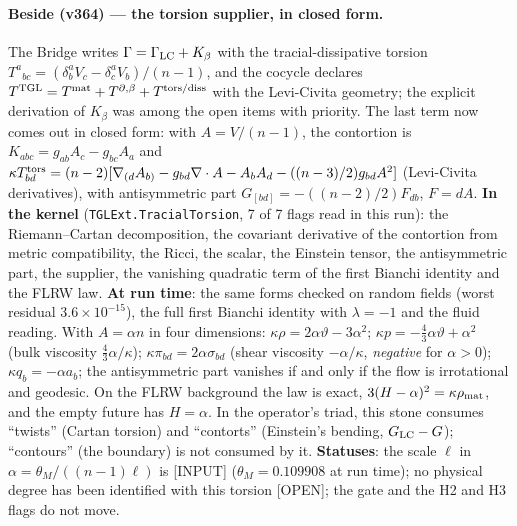 \documentclass[11pt]{article}
\theoremstyle{definition}\newtheorem{deriv}{Derivation}
\begin{document}
\paragraph*{Beside (v364) --- the torsion supplier, in closed form.} The Bridge writes $\Gamma=\Gamma_{\rm LC}+K_\beta$ with the tracial-dissipative torsion $T^a{}_{bc}=(\delta^a_bV_c-\delta^a_cV_b)/(n-1)$, and the cocycle declares $T^{\rm TGL}=T^{\rm mat}+T^{\partial,\beta}+T^{\rm tors/diss}$ with the Levi-Civita geometry; the explicit derivation of $K_\beta$ was among the open items with priority. The last term now comes out in closed form: with $A=V/(n-1)$, the contortion is $K_{abc}=g_{ab}A_c-g_{bc}A_a$ and $\kappa T^{\rm tors}_{bd}=(n-2)[\nabla_{(d}A_{b)}-g_{bd}\nabla\cdot A-A_bA_d-((n-3)/2)g_{bd}A^2]$ (Levi-Civita derivatives), with antisymmetric part $G_{[bd]}=-((n-2)/2)F_{db}$, $F=dA$. \textbf{In the kernel} (\texttt{TGLExt.TracialTorsion}, 7 of 7 flags read in this run): the Riemann--Cartan decomposition, the covariant derivative of the contortion from metric compatibility, the Ricci, the scalar, the Einstein tensor, the antisymmetric part, the supplier, the vanishing quadratic term of the first Bianchi identity and the FLRW law. \textbf{At run time}: the same forms checked on random fields (worst residual $3.6\times10^{-15}$), the full first Bianchi identity with $\lambda=-1$ and the fluid reading. With $A=\alpha n$ in four dimensions: $\kappa\rho=2\alpha\vartheta-3\alpha^2$; $\kappa p=-\tfrac43\alpha\vartheta+\alpha^2$ (bulk viscosity $\tfrac43\alpha/\kappa$); $\kappa\pi_{bd}=2\alpha\sigma_{bd}$ (shear viscosity $-\alpha/\kappa$, \emph{negative} for $\alpha>0$); $\kappa q_b=-\alpha a_b$; the antisymmetric part vanishes if and only if the flow is irrotational and geodesic. On the FLRW background the law is exact, $3(H-\alpha)^2=\kappa\rho_{\rm mat}$, and the empty future has $H=\alpha$. In the operator's triad, this stone consumes ``twists'' (Cartan torsion) and ``contorts'' (Einstein's bending, $G_{\rm LC}-G$); ``contours'' (the boundary) is not consumed by it. \textbf{Statuses}: the scale $\ell$ in $\alpha=\theta_M/((n-1)\ell)$ is [INPUT] ($\theta_M=0.109908$ at run time); no physical degree has been identified with this torsion [OPEN]; the gate and the H2 and H3 flags do not move.
\end{document}
